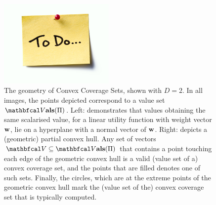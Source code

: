     \begin{figure}
        \centering\includegraphics[width=0.5\textwidth]{figures/todo.jpg} 
        \caption[The geometry of Convex Coverage Sets.]{The geometry of Convex Coverage Sets, shown with $D=2$. In all images, the points depicted correspond to a value set $\valset(\Pi)$. Left: demonstrates that values obtaining the same scalarised value, for a linear utility function with weight vector $\mathbf{w}$, lie on a hyperplane with a normal vector of $\mathbf{w}$. Right: depicts a (geometric) partial convex hull. Any set of vectors $\bfcl{V}\subseteq\valset(\Pi)$ that contains a point touching each edge of the geometric convex hull is a valid (value set of a) convex coverage set, and the points that are filled denotes one of such sets. Finally, the circles, which are at  the extreme points of the geometric convex hull mark the (value set of the) convex coverage set that is typically computed.}
        \label{fig:convex_hull_geometry}
    \end{figure}

